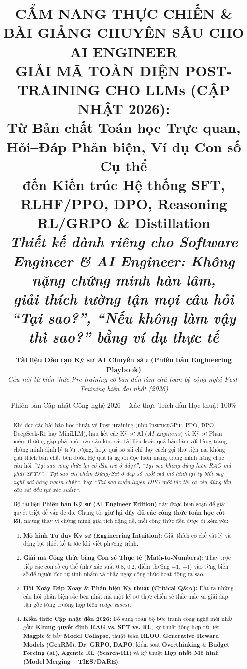 \documentclass[11pt,a4paper,oneside]{report}
\title{
    \vspace{-1.8cm}
    {\Large \textbf{CẨM NANG THỰC CHIẾN \& BÀI GIẢNG CHUYÊN SÂU CHO AI ENGINEER}}\\[0.4cm]
    {\LARGE \textbf{\textcolor{stanfordred}{GIẢI MÃ TOÀN DIỆN POST-TRAINING CHO LLMs (CẬP NHẬT 2026):}}}\\[0.25cm]
    {\Large \textbf{Từ Bản chất Toán học Trực quan, Hỏi--Đáp Phản biện, Ví dụ Con số Cụ thể\\đến Kiến trúc Hệ thống SFT, RLHF/PPO, DPO, Reasoning RL/GRPO \& Distillation}}\\[0.7cm]
    {\normalsize \textit{Thiết kế dành riêng cho Software Engineer \& AI Engineer: Không nặng chứng minh hàn lâm,\\giải thích tường tận mọi câu hỏi ``Tại sao?'', ``Nếu không làm vậy thì sao?'' bằng ví dụ thực tế}}
}
\author{
    \textbf{Tài liệu Đào tạo Kỹ sư AI Chuyên sâu (Phiên bản Engineering Playbook)}\\
    \textit{Cầu nối từ kiến thức Pre-training cơ bản đến làm chủ toàn bộ công nghệ Post-Training hiện đại nhất (2026)}
}
\date{Phiên bản Cập nhật Công nghệ 2026 -- Xác thực Trích dẫn Học thuật 100\%}
\theoremstyle{definition}
\begin{document}
\maketitle

\begin{abstract}
\noindent
Khi đọc các bài báo học thuật về Post-Training (như InstructGPT, PPO, DPO, DeepSeek-R1 hay MiniLLM), hầu hết các Kỹ sư AI (\textit{AI Engineers}) và Kỹ sư Phần mềm thường gặp phải một rào cản lớn: các tài liệu hoặc quá hàn lâm với hàng trang chứng minh định lý trừu tượng, hoặc quá sơ sài chỉ dạy cách gọi thư viện mà không giải thích bản chất bên dưới. Hệ quả là người đọc luôn mang trong mình hàng chục câu hỏi \textit{``Tại sao công thức lại có dấu trừ ở đây?''}, \textit{``Tại sao không dùng luôn RAG mà phải SFT?''}, \textit{``Tại sao chỉ chấm Đúng/Sai ở đáp số cuối mà mô hình lại tự biết suy nghĩ dài hàng nghìn chữ?''}, hay \textit{``Tại sao huấn luyện DPO một lúc thì cả câu đúng lẫn câu sai đều tụt xác suất?''}.

\vspace{0.3cm}
\noindent
Bộ tài liệu \textbf{Phiên bản Kỹ sư (AI Engineer Edition)} này được biên soạn để giải quyết triệt để vấn đề đó. Chúng tôi \textbf{giữ lại đầy đủ các công thức toán học cốt lõi}, nhưng thay vì chứng minh giải tích nặng nề, mỗi công thức đều được đi kèm với:
\begin{enumerate}[leftmargin=1.4cm]
    \item \textbf{Mô hình Tư duy Kỹ sư (Engineering Intuition):} Giải thích cơ chế vật lý và động lực thiết kế trước khi viết phương trình.
    \item \textbf{Giải mã Công thức bằng Con số Thực tế (Math-to-Numbers):} Thay trực tiếp các con số cụ thể (như xác suất $0.8$, $0.2$, điểm thưởng $+1$, $-1$) vào từng biến số để người đọc tự tính nhẩm và thấy ngay công thức hoạt động ra sao.
    \item \textbf{Hỏi Xoáy Đáp Xoay \& Phản biện Kỹ thuật (Critical Q\&A):} Đặt ra những câu hỏi phản biện sắc bén nhất mà một kỹ sư thực chiến sẽ thắc mắc và giải đáp tận gốc từng trường hợp biên (\textit{edge cases}).
    \item \textbf{Kiến thức Cập nhật đến 2026:} Bổ sung toàn bộ bức tranh công nghệ mới nhất gồm \textbf{Khung quyết định RAG vs. SFT vs. RL}, kỹ thuật tổng hợp dữ liệu \textbf{Magpie} \& bẫy \textbf{Model Collapse}, thuật toán \textbf{RLOO}, \textbf{Generative Reward Models (GenRM)}, \textbf{Dr. GRPO}, \textbf{DAPO}, kiểm soát \textbf{Overthinking} \& \textbf{Budget Forcing (s1)}, \textbf{Agentic RL (Search-R1)} và kỹ thuật \textbf{Hợp nhất Mô hình (Model Merging -- TIES/DARE)}.
\end{enumerate}
\end{abstract}
\end{document}
